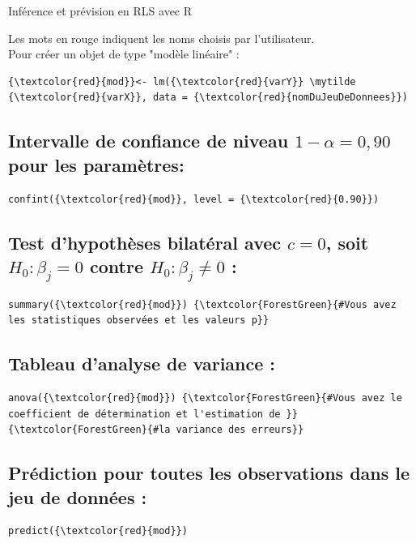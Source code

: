 \documentclass[letter, 11pt]{article}
\newcommand{\mytilde}{$\sim$}
\begin{document}
\vspace*{0.01 cm}
\begin{center}
{\Large Inférence  et prévision en RLS avec R }
\end{center}

Les mots en rouge indiquent les noms choisis par l'utilisateur.\\

Pour créer un objet de type "modèle linéaire" :
\begin{Verbatim}[commandchars=\\\{\}]
{\textcolor{red}{mod}}<- lm({\textcolor{red}{varY}} \mytilde {\textcolor{red}{varX}}, data = {\textcolor{red}{nomDuJeuDeDonnees}})
\end{Verbatim}

\subsection*{Intervalle de confiance de niveau $1-\alpha=0,90$ pour les paramètres:}
\begin{Verbatim}
confint({\textcolor{red}{mod}}, level = {\textcolor{red}{0.90}})
\end{Verbatim}

\subsection*{Test d’hypothèses bilatéral avec $c=0$, soit $H_0:\beta_j=0$ contre $H_0:\beta_j\neq 0$  :}
\begin{Verbatim}
summary({\textcolor{red}{mod}}) {\textcolor{ForestGreen}{#Vous avez les statistiques observées et les valeurs p}}
\end{Verbatim}

\subsection*{Tableau d’analyse de variance :}
\begin{Verbatim}
anova({\textcolor{red}{mod}}) {\textcolor{ForestGreen}{#Vous avez le coefficient de détermination et l'estimation de }}
{\textcolor{ForestGreen}{#la variance des erreurs}}
\end{Verbatim}

\subsection*{Prédiction pour toutes les observations dans le jeu de données :}
\begin{Verbatim}
predict({\textcolor{red}{mod}})
\end{Verbatim}
\end{document}
